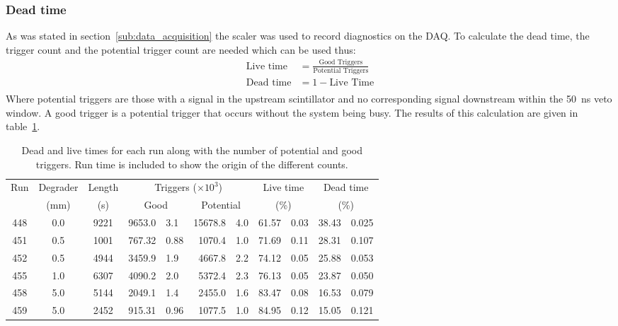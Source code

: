 \subsubsection{Dead time} %
\label{sub:dead_time}
As was stated in section~\ref{sub:data_acquisition} the scaler was used to record diagnostics on the DAQ. To calculate the dead time, the trigger count and the potential trigger count are needed which can be used thus:
\begin{align}
    \text{Live time} &= \frac{\text{Good Triggers}}{\text{Potential Triggers}} \\
    \text{Dead time} &= 1 - \text{Live Time} \\
\end{align}
Where potential triggers are those with a signal in the upstream scintillator and no corresponding signal downstream within the 50~ns veto window. A good trigger is a potential trigger that occurs without the system being busy. The results of this calculation are given in table~\ref{tab:dead_time}.
\begin{table}
    \begin{center}
    \begin{tabular}{c | c | c | r@{ $\pm$ }l | r@{ $\pm$ }l | r@{ $\pm$ }l | r@{ $\pm$ }l }
        \multirow{2}{*}{Run} 
             &  Degrader  &  Length 
                              & \multicolumn{4}{c|}{Triggers (\(\times10^3\))}
                              & \multicolumn{2}{c|}{Live time}
                              & \multicolumn{2}{c}{Dead time}  \\
             & (mm)       & (s)               
                              & \multicolumn{2}{c|}{Good}
                              & \multicolumn{2}{c|}{Potential}
                              & \multicolumn{2}{c|}{(\%)}
                              & \multicolumn{2}{c}{(\%)}  \\
        \hline
        448  &  0.0  &  9221  &  9653.0 & 3.1   &  15678.8 & 4.0  &  61.57 & 0.03  &  38.43 & 0.025 \\
        451  &  0.5  &  1001  &  767.32 & 0.88  &   1070.4 & 1.0  &  71.69 & 0.11  &  28.31 & 0.107 \\
        452  &  0.5  &  4944  &  3459.9 & 1.9   &   4667.8 & 2.2  &  74.12 & 0.05  &  25.88 & 0.053 \\
        455  &  1.0  &  6307  &  4090.2 & 2.0   &   5372.4 & 2.3  &  76.13 & 0.05  &  23.87 & 0.050 \\
        458  &  5.0  &  5144  &  2049.1 & 1.4   &   2455.0 & 1.6  &  83.47 & 0.08  &  16.53 & 0.079 \\
        459  &  5.0  &  2452  &  915.31 & 0.96  &   1077.5 & 1.0  &  84.95 & 0.12  &  15.05 & 0.121 \\
    \end{tabular}
    \end{center}
    \caption{Dead and live times for each run along with the number of potential and good triggers. Run time is included to show the origin of the different counts.}
    \label{tab:dead_time}
\end{table}
